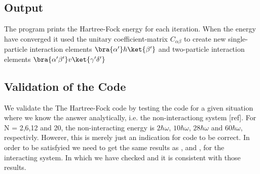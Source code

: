 \subsection{Output}
The program prints the Hartree-Fock energy for each iteration. When the energy have converged it used the unitary coefficient-matrix $C_{\alpha \beta}$ to create new single-particle interaction elements $\bra{\alpha'}h\ket{\beta'}$
and two-particle interaction elements $\bra{\alpha'\beta'}v\ket{\gamma'\delta'}$

\subsection{Validation of the Code}
We validate the The Hartree-Fock code by testing the code for a given situation where we know the answer analytically, i.e. the non-interactiong system [ref]. For N = 2,6,12 and 20, the non-interacting energy is $2 \hbar \omega$, $10 \hbar \omega$, $28\hbar \omega$ and $60 \hbar \omega$, respectivly. Howerer, this is merely just an indication for code to be correct. In order to be satisfyied we need to get the same results as \cite{lohne},\cite{merlot} and \cite{lohne-article}, for the interacting system. In which we have checked and it is consistent with those results.

